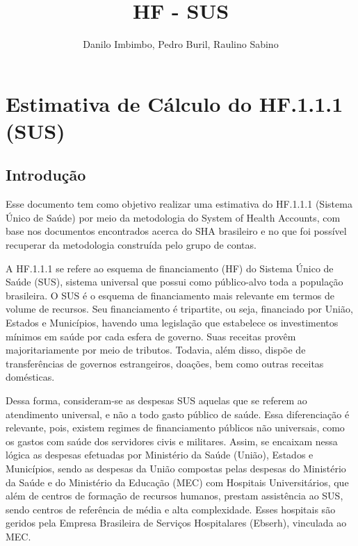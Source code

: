 \documentclass[
  letterpaper,
  DIV=11,
  numbers=noendperiod]{scrartcl}
\title{HF - SUS}
\author{Danilo Imbimbo, Pedro Buril, Raulino Sabino}
\date{}
\begin{document}
\maketitle
\ifdefined\Shaded\renewenvironment{Shaded}{\begin{tcolorbox}[frame hidden, boxrule=0pt, breakable, interior hidden, sharp corners, enhanced, borderline west={3pt}{0pt}{shadecolor}]}{\end{tcolorbox}}\fi

\hypertarget{estimativa-de-cuxe1lculo-do-hf.1.1.1-sus}{%
\section{Estimativa de Cálculo do HF.1.1.1
(SUS)}\label{estimativa-de-cuxe1lculo-do-hf.1.1.1-sus}}

\hypertarget{introduuxe7uxe3o}{%
\subsection{Introdução}\label{introduuxe7uxe3o}}

Esse documento tem como objetivo realizar uma estimativa do HF.1.1.1
(Sistema Único de Saúde) por meio da metodologia do System of Health
Accounts, com base nos documentos encontrados acerca do SHA brasileiro e
no que foi possível recuperar da metodologia construída pelo grupo de
contas.

A HF.1.1.1 se refere ao esquema de financiamento (HF) do Sistema Único
de Saúde (SUS), sistema universal que possui como público-alvo toda a
população brasileira. O SUS é o esquema de financiamento mais relevante
em termos de volume de recursos. Seu financiamento é tripartite, ou
seja, financiado por União, Estados e Municípios, havendo uma legislação
que estabelece os investimentos mínimos em saúde por cada esfera de
governo. Suas receitas provêm majoritariamente por meio de tributos.
Todavia, além disso, dispõe de transferências de governos estrangeiros,
doações, bem como outras receitas domésticas.

Dessa forma, consideram-se as despesas SUS aquelas que se referem ao
atendimento universal, e não a todo gasto público de saúde. Essa
diferenciação é relevante, pois, existem regimes de financiamento
públicos não universais, como os gastos com saúde dos servidores civis e
militares. Assim, se encaixam nessa lógica as despesas efetuadas por
Ministério da Saúde (União), Estados e Municípios, sendo as despesas da
União compostas pelas despesas do Ministério da Saúde e do Ministério da
Educação (MEC) com Hospitais Universitários, que além de centros de
formação de recursos humanos, prestam assistência ao SUS, sendo centros
de referência de média e alta complexidade. Esses hospitais são geridos
pela Empresa Brasileira de Serviços Hospitalares (Ebserh), vinculada ao
MEC.
\end{document}
